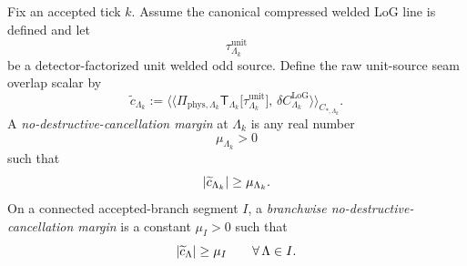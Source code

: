 \begin{definition}
\label{def:unit-source-overlap-margin}
Fix an accepted tick \(k\).
Assume the canonical compressed welded LoG line is defined and let
\[
\tau^{\mathrm{unit}}_{\Lambda_k}
\]
be a detector-factorized unit welded odd source.
Define the raw unit-source seam overlap scalar by
\begin{equation}
\widetilde c_{\Lambda_k}
:=
\big\langle\!\big\langle
\Pi_{\mathrm{phys},\Lambda_k}\mathsf T_{\Lambda_k}\!\big[\tau^{\mathrm{unit}}_{\Lambda_k}\big],\,
\delta C^{\mathrm{LoG}}_{\Lambda_k}
\big\rangle\!\big\rangle_{C_{\ast,\Lambda_k}}.
\label{eq:unit-source-overlap-scalar}
\end{equation}
A \emph{no-destructive-cancellation margin} at \(\Lambda_k\) is any real number
\[
\mu_{\Lambda_k}>0
\]
such that
\begin{equation}
\left\lvert \widetilde c_{\Lambda_k}\right\rvert\ge \mu_{\Lambda_k}.
\label{eq:no-destr-cancel-margin}
\end{equation}
On a connected accepted-branch segment \(I\), a \emph{branchwise no-destructive-cancellation
margin} is a constant \(\mu_I>0\) such that
\begin{equation}
\left\lvert \widetilde c_{\Lambda}\right\rvert\ge \mu_I
\qquad
\forall\,\Lambda\in I.
\label{eq:no-destr-cancel-margin-branch}
\end{equation}
\end{definition}

